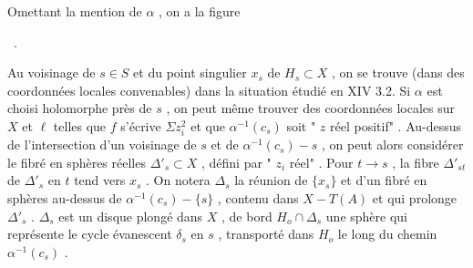 Omettant la mention de $\alpha$ , on a la figure

\begin{center}
\ .
\end{center}
Au voisinage de $s \in S$ et du point singulier $x_s$ de $H_s \subset X$ , on se trouve (dans des coordonnées locales convenables) dans la situation étudié en XIV 3.2. Si $\alpha$ est choisi holomorphe près de $s$ , on peut même trouver des coordonnées locales sur $X$ et $\ell$ telles que $f$ s'écrive $\Sigma z_i^2$ et que $\alpha^{-1}(c_s)$ soit " $z$ réel positif" . Au-dessus de l'intersection d'un voisinage de $s$ et de $\alpha^{-1}(c_s) - s$ , on peut alors considérer le fibré en sphères réelles $\Delta'_s \subset X$ , défini par " $z_i$ réel" . Pour $t \to s$ , la fibre $\Delta'_{st}$ de $\Delta'_s$ en $t$ tend vers $x_s$ . On notera $\Delta_s$ la réunion de $\{x_s\}$ et d'un fibré en sphères au-dessus de $\alpha^{-1}(c_s) - \{s\}$ , contenu dans $X - T(A)$ et qui prolonge $\Delta'_s$ . $\Delta_s$ est un disque plongé dans $X$ , de bord $H_o \cap \Delta_s$ une sphère qui représente le cycle évanescent $\delta_s$ en $s$ , transporté dans $H_o$ le long du chemin $\alpha^{-1}(c_s)$ .

